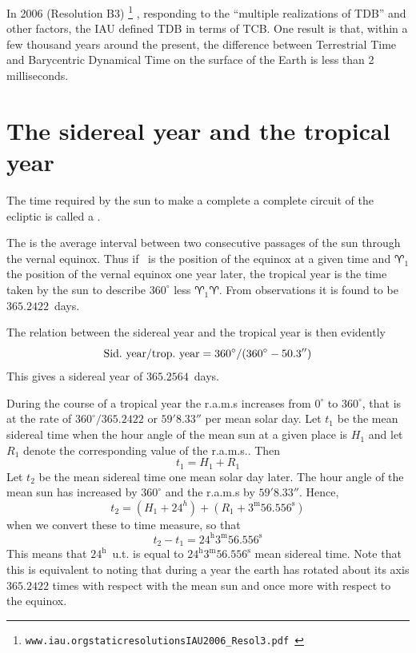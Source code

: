 In 2006 (Resolution B3)
\footnote{
\tt www.iau.org\/static\/resolutions\/IAU2006\_Resol3.pdf
}
, responding to the ``multiple realizations of TDB''
and other factors, the IAU defined TDB in terms of TCB. One result is that, 
within a few thousand years around the present, the difference between 
Terrestrial Time and Barycentric Dynamical Time on the surface of the Earth 
is less than 2 milliseconds. 

\section{The sidereal year and the tropical year}

The time required by the sun to make a complete a complete circuit of the 
ecliptic is called a {}. 

The {} is the average interval between two consecutive 
passages of the sun through the vernal equinox. Thus if \aries\ is the 
position of the equinox
at a given time and $\aries_1$ the position of the vernal equinox one year later, the 
tropical year is the time taken by the sun to describe $360^\circ$ less 
$\aries_1\aries$. From observations it is found to be $365.2422$~days. 

The relation between the sidereal year and the tropical year is then evidently
\[ 
{{\rm Sid.~year}/{\rm trop.~year}}={360^\circ/{(360^\circ-50.3'')}}
\]
This gives a sidereal year of $365.2564$~days.

During the course of a tropical year the {\sc r.a.m.s} increases from $0^\circ$ to
$360^\circ$, that is at the rate of $360^\circ/365.2422$ or $59'8.33''$ per mean 
solar day. Let $t_1$ be the mean sidereal time when the hour angle of the mean sun
at a given place is $H_1$ and let $R_1$ denote the corresponding value of 
the {\sc r.a.m.s.}. Then
\[
t_1=H_1+R_1
\]
Let $t_2$ be the mean sidereal time one mean solar day later. The hour angle of 
the mean sun has increased by $360^\circ$ and the {\sc r.a.m.s} by $59'8.33''$.
Hence,
\[
	t_2=(H_1+24^h)+(R_1+3^{\mathrm{m}}56.556^{\mathrm{s}})
\]
when we convert these to time measure, so that 
\[
	t_2-t_1=24^{\mathrm{h}}3^{\mathrm{m}}56.556^{\mathrm{s}}
\]
This means that $24^{\mathrm{h}}$~{\sc u.t.} is equal to
$24^{\mathrm{h}}3^{\mathrm{m}}56.556^{\mathrm{s}}$ mean sidereal time.
Note that this is equivalent to noting that during a year the earth has rotated about
its axis $365.2422$ times with respect with the mean sun and once more with respect
to the equinox.

